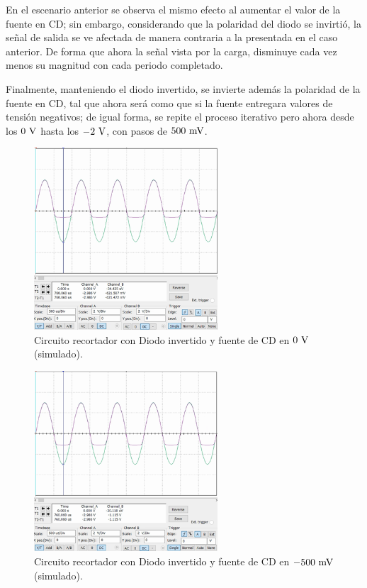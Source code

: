 \documentclass[journal]{IEEEtran}
\begin{document}
En el escenario anterior se observa el mismo efecto al aumentar el valor de la fuente en CD; sin embargo, considerando
que la polaridad del diodo se invirtió, la señal de salida se ve afectada de manera contraria a la presentada en el caso anterior.
De forma que ahora la señal vista por la carga, disminuye cada vez menos su magnitud con cada periodo completado.

Finalmente, manteniendo el diodo invertido, se invierte además la polaridad de la fuente en CD, tal que ahora será como que si la fuente
entregara valores de tensión negativos; de igual forma, se repite el proceso iterativo pero ahora desde los $0~\textnormal{V}$ hasta los $-2~\textnormal{V}$, con pasos de $500~\textnormal{mV}$.
\begin{figure}[H]
        \centering
        \includegraphics[width=2.7in]{SignalSimulated_15.png}
        \caption{Circuito recortador con Diodo invertido y fuente de CD en $0~\textnormal{V}$ (simulado).}
        \label{fig:SignalSimulated_15}
\end{figure}
\begin{figure}[H]
        \centering
        \includegraphics[width=2.7in]{SignalSimulated_16.png}
        \caption{Circuito recortador con Diodo invertido y fuente de CD en $-500~\textnormal{mV}$ (simulado).}
        \label{fig:SignalSimulated_16}
\end{figure}
\end{document}
